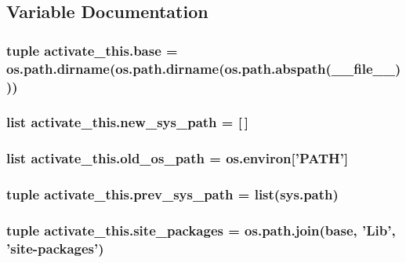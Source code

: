 \subsection{Variable Documentation}
\hypertarget{namespaceactivate__this_a1991b325073a471cc79e0618269a6a99}{
\subsubsection[{base}]{\setlength{\rightskip}{0pt plus 5cm}tuple activate\-\_\-this.\-base = os.\-path.\-dirname(os.\-path.\-dirname(os.\-path.\-abspath(\-\_\-\-\_\-file\-\_\-\-\_\-)))}}\label{namespaceactivate__this_a1991b325073a471cc79e0618269a6a99}
\hypertarget{namespaceactivate__this_a0da23a91013e49768e9347fcdd781d3d}{
\subsubsection[{new\-\_\-sys\-\_\-path}]{\setlength{\rightskip}{0pt plus 5cm}list activate\-\_\-this.\-new\-\_\-sys\-\_\-path = \mbox{[}$\,$\mbox{]}}}\label{namespaceactivate__this_a0da23a91013e49768e9347fcdd781d3d}
\hypertarget{namespaceactivate__this_a873e4b6c60168d32296fd4d7c71729a8}{
\subsubsection[{old\-\_\-os\-\_\-path}]{\setlength{\rightskip}{0pt plus 5cm}list activate\-\_\-this.\-old\-\_\-os\-\_\-path = os.\-environ\mbox{[}'P\-A\-T\-H'\mbox{]}}}\label{namespaceactivate__this_a873e4b6c60168d32296fd4d7c71729a8}
\hypertarget{namespaceactivate__this_a7cb3478e983ceabe76c7445e9dec7891}{
\subsubsection[{prev\-\_\-sys\-\_\-path}]{\setlength{\rightskip}{0pt plus 5cm}tuple activate\-\_\-this.\-prev\-\_\-sys\-\_\-path = list(sys.\-path)}}\label{namespaceactivate__this_a7cb3478e983ceabe76c7445e9dec7891}
\hypertarget{namespaceactivate__this_a108e827412e25bb10aa807f71ff0fda1}{
\subsubsection[{site\-\_\-packages}]{\setlength{\rightskip}{0pt plus 5cm}tuple activate\-\_\-this.\-site\-\_\-packages = os.\-path.\-join({\bf base}, 'Lib', 'site-\/packages')}}\label{namespaceactivate__this_a108e827412e25bb10aa807f71ff0fda1}
